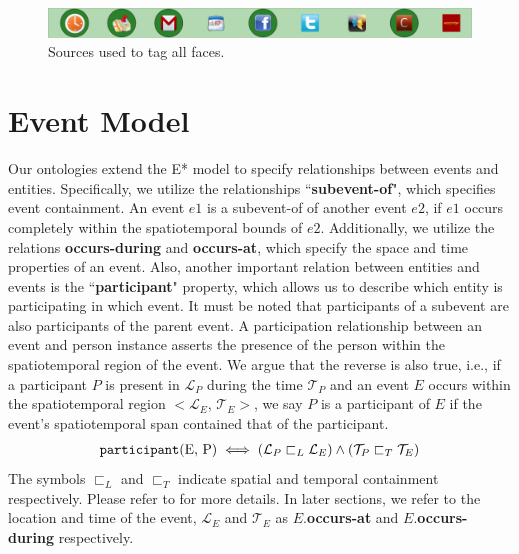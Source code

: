 \begin{figure}[h]
\centering
\includegraphics[width=\textwidth]{media/chapter4/stacktrace/vldb-source-3.png}
\caption{Sources used to tag all faces.}
\label{fig:vldb-network-3}
\end{figure}


\section{Event Model}
Our ontologies extend the E* model\cite{gupta2011managing} to specify relationships between events and entities. Specifically, we utilize the relationships ``\textbf{subevent-of}", which specifies event containment. An event $e1$ is a subevent-of of another event $e2$, if $e1$ occurs completely within the spatiotemporal bounds of $e2$. Additionally, we utilize the relations \textbf{occurs-during} and \textbf{occurs-at}, which specify the space and time properties of an event. Also, another important relation between entities and events is the ``\textbf{participant}" property, which allows us to describe which entity is participating in which event. It must be noted that participants of a subevent are also participants of the parent event. A participation relationship between an event and person instance asserts the presence of the person within the spatiotemporal region of the event. We argue that the reverse is also true, i.e., if a participant $P$ is present in $\mathcal{L}_P$ during the time $\mathcal{T}_P$ and an event $E$ occurs within the spatiotemporal region $<\mathcal{L}_E$, $\mathcal{T}_E>$, we say $P$ is a participant of $E$ if the event's spatiotemporal span contained that of the participant.
\begin{equation}
\label{eq:participation-region}
\begin{aligned}
\text{\texttt{participant}(E, P)} \iff (\mathcal{L}_P \sqsubset_L \mathcal{L}_E) \wedge (\mathcal{T}_P \sqsubset_T \mathcal{T}_E)
\end{aligned}
\end{equation}
The symbols $\sqsubset_L$ and $\sqsubset_T$ indicate spatial and temporal containment respectively. Please refer to \cite{gupta2011managing} for more details. In later sections, we refer to the location and time of the event, $\mathcal{L}_E$ and $\mathcal{T}_E$ as $E$.\textbf{occurs-at} and $E.$\textbf{occurs-during} respectively. 

